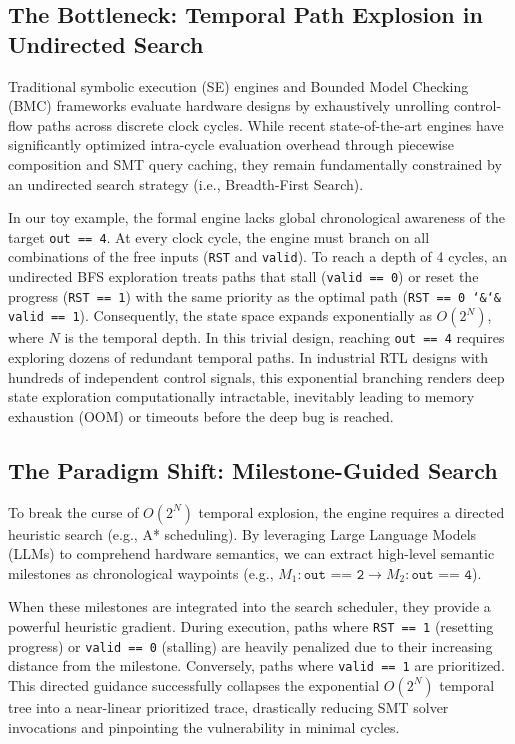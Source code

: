 \documentclass[conference]{IEEEtran}
\begin{document}
\subsection{The Bottleneck: Temporal Path Explosion in Undirected Search}
Traditional symbolic execution (SE) engines and Bounded Model Checking (BMC) frameworks evaluate hardware designs by exhaustively unrolling control-flow paths across discrete clock cycles. While recent state-of-the-art engines have significantly optimized intra-cycle evaluation overhead through piecewise composition and SMT query caching, they remain fundamentally constrained by an undirected search strategy (i.e., Breadth-First Search).

In our toy example, the formal engine lacks global chronological awareness of the target \texttt{out == 4}. At every clock cycle, the engine must branch on all combinations of the free inputs (\texttt{RST} and \texttt{valid}). To reach a depth of 4 cycles, an undirected BFS exploration treats paths that stall (\texttt{valid == 0}) or reset the progress (\texttt{RST == 1}) with the same priority as the optimal path (\texttt{RST == 0 \char`\&\char`\& valid == 1}). Consequently, the state space expands exponentially as $O(2^N)$, where $N$ is the temporal depth. In this trivial design, reaching \texttt{out == 4} requires exploring dozens of redundant temporal paths. In industrial RTL designs with hundreds of independent control signals, this exponential branching renders deep state exploration computationally intractable, inevitably leading to memory exhaustion (OOM) or timeouts before the deep bug is reached.

\subsection{The Paradigm Shift: Milestone-Guided Search}
To break the curse of $O(2^N)$ temporal explosion, the engine requires a directed heuristic search (e.g., A* scheduling). By leveraging Large Language Models (LLMs) to comprehend hardware semantics, we can extract high-level semantic milestones as chronological waypoints (e.g., $M_1: \texttt{out == 2} \rightarrow M_2: \texttt{out == 4}$).

When these milestones are integrated into the search scheduler, they provide a powerful heuristic gradient. During execution, paths where \texttt{RST == 1} (resetting progress) or \texttt{valid == 0} (stalling) are heavily penalized due to their increasing distance from the milestone. Conversely, paths where \texttt{valid == 1} are prioritized. This directed guidance successfully collapses the exponential $O(2^N)$ temporal tree into a near-linear prioritized trace, drastically reducing SMT solver invocations and pinpointing the vulnerability in minimal cycles.
\end{document}
